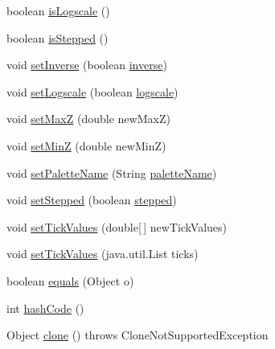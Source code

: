 \begin{DoxyCompactItemize}
\item 
boolean \mbox{\hyperlink{classorg_1_1jfree_1_1chart_1_1plot_1_1_color_palette_a829008cda055831fc8ae5556f232538a}{is\+Logscale}} ()
\item 
boolean \mbox{\hyperlink{classorg_1_1jfree_1_1chart_1_1plot_1_1_color_palette_aedc6edbe065d4be4e1c15783db34249e}{is\+Stepped}} ()
\item 
void \mbox{\hyperlink{classorg_1_1jfree_1_1chart_1_1plot_1_1_color_palette_a61ca8d86c00dc359bbae46cb632b862b}{set\+Inverse}} (boolean \mbox{\hyperlink{classorg_1_1jfree_1_1chart_1_1plot_1_1_color_palette_a3de729d7241de088dcd7d10fe6791152}{inverse}})
\item 
void \mbox{\hyperlink{classorg_1_1jfree_1_1chart_1_1plot_1_1_color_palette_a761a2fbd892ffe2401aa2df315855ef0}{set\+Logscale}} (boolean \mbox{\hyperlink{classorg_1_1jfree_1_1chart_1_1plot_1_1_color_palette_a58ad492cf420f27bd91f50de3971c2b3}{logscale}})
\item 
void \mbox{\hyperlink{classorg_1_1jfree_1_1chart_1_1plot_1_1_color_palette_a21e8c735de8ecf48512d203172fb02c1}{set\+MaxZ}} (double new\+MaxZ)
\item 
void \mbox{\hyperlink{classorg_1_1jfree_1_1chart_1_1plot_1_1_color_palette_aa834fb95af47bad429a81a6c06e53707}{set\+MinZ}} (double new\+MinZ)
\item 
void \mbox{\hyperlink{classorg_1_1jfree_1_1chart_1_1plot_1_1_color_palette_ac2c373341698c585d5accbf52a3228f2}{set\+Palette\+Name}} (String \mbox{\hyperlink{classorg_1_1jfree_1_1chart_1_1plot_1_1_color_palette_a8cffba3a85931f06bbeb75360fdd8d5a}{palette\+Name}})
\item 
void \mbox{\hyperlink{classorg_1_1jfree_1_1chart_1_1plot_1_1_color_palette_ac083bf560f5a2809920501e9bcf392ff}{set\+Stepped}} (boolean \mbox{\hyperlink{classorg_1_1jfree_1_1chart_1_1plot_1_1_color_palette_a5a0ce2a263308e7c22087c382a2100d5}{stepped}})
\item 
void \mbox{\hyperlink{classorg_1_1jfree_1_1chart_1_1plot_1_1_color_palette_ab1c97737f0833b3aaec78defebb59d81}{set\+Tick\+Values}} (double\mbox{[}$\,$\mbox{]} new\+Tick\+Values)
\item 
void \mbox{\hyperlink{classorg_1_1jfree_1_1chart_1_1plot_1_1_color_palette_a82d02d6799fca6b637c54d74e78ca1a1}{set\+Tick\+Values}} (java.\+util.\+List ticks)
\item 
boolean \mbox{\hyperlink{classorg_1_1jfree_1_1chart_1_1plot_1_1_color_palette_a5fdca08a4c599b4ed52e4d5c9cb3eafc}{equals}} (Object o)
\item 
int \mbox{\hyperlink{classorg_1_1jfree_1_1chart_1_1plot_1_1_color_palette_aa2ecb521e2ea012ad10807742d8b2a8a}{hash\+Code}} ()
\item 
Object \mbox{\hyperlink{classorg_1_1jfree_1_1chart_1_1plot_1_1_color_palette_a558072d493d70c42cddaf6810cf09eba}{clone}} ()  throws Clone\+Not\+Supported\+Exception 
\end{DoxyCompactItemize}
